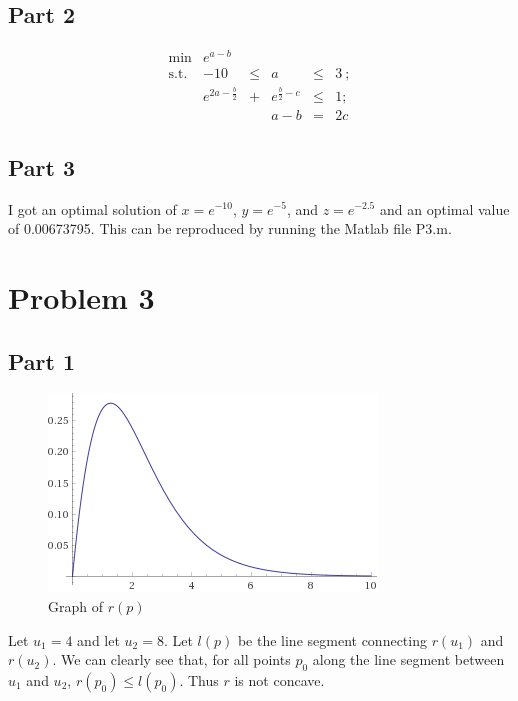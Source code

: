 \documentclass{article}
\begin{document}
\subsection{Part 2}

\[
\begin{array}{rrclcc}
 \min & e^{a - b} &      &   \\
 \mbox{s.t.}  &  -10  & \le  & a & \le & 3 ~; \\
    & e^{2a - \frac{b}{2}} & + & e^{\frac{b}{2} - c} & \le & 1;\\
    &&& a - b & = & 2c
 \end{array}
\]

\subsection{Part 3}

I got an optimal solution of $x = e^{-10}$, $y = e^{-5}$, and $z = e^{-2.5}$ and an optimal value of 0.00673795. This can be reproduced by running the Matlab file P3.m.

\section{Problem 3}

\subsection{Part 1}

\begin{figure}[H] %
  \centering
  \includegraphics[angle=0,totalheight=50mm]{P3.png}
  \caption{Graph of $r(p)$}
  \label{fig:tabl}
\end{figure}

Let $u_1 = 4$ and let $u_2 = 8$. Let $l(p)$ be the line segment connecting $r(u_1)$ and $r(u_2)$. We can clearly see that, for all points $p_0$ along the line segment between $u_1$ and $u_2$, $r(p_0) \le l(p_0)$. Thus $r$ is not concave.
\end{document}
